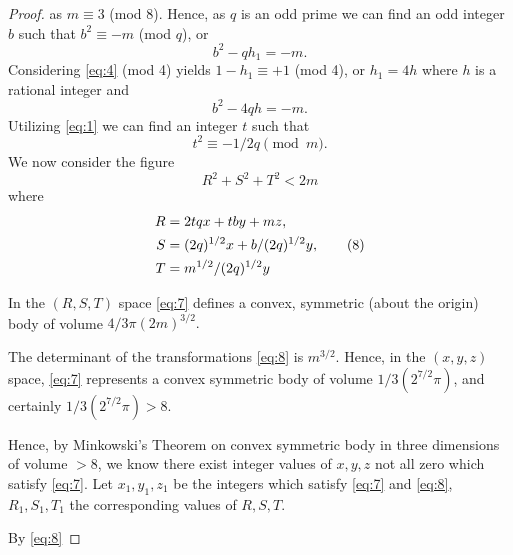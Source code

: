 \begin{proof}
as $m\equiv3$ (mod 8).
Hence, as $q$ is an odd prime we can find an odd integer $b$ such that $b^{2}\equiv-m$ (mod $q$), or
\begin{equation}
b^{2}-qh_{1}=-m. \label{eq:4} \tag{4}
\end{equation}
Considering \eqref{eq:4} (mod 4) yields $1-h_{1}\equiv+1$ (mod 4), or $h_{1}=4h$ where $h$ is a rational integer and
\begin{equation}
b^{2}-4qh=-m. \label{eq:5} \tag{5}
\end{equation}
Utilizing \eqref{eq:1} we can find an integer $t$ such that
\begin{equation}
t^{2}\equiv-1/2q \pmod{m}. \label{eq:6} \tag{6}
\end{equation}
We now consider the figure
\begin{equation}
R^{2}+S^{2}+T^{2}<2m \label{eq:7} \tag{7}
\end{equation}
where
\begin{align}
R&=2tqx+tby+mz, \notag \\
S&=(2q)^{1/2}x+b/(2q)^{1/2}y, \label{eq:8} \tag{8} \\
T&=m^{1/2}/(2q)^{1/2}y \notag
\end{align}

In the $(R, S, T)$ space \eqref{eq:7} defines a convex, symmetric (about the origin) body of volume $4/3\pi(2m)^{3/2}.$

The determinant of the transformations \eqref{eq:8} is $m^{3/2}$. Hence, in the $(x, y, z)$ space, \eqref{eq:7} represents a
convex symmetric body of volume $1/3(2^{7/2}\pi)$, and certainly $1/3(2^{7/2}\pi) > 8$.

Hence, by Minkowski's Theorem on convex symmetric body in three dimensions of volume $>8$, we know there exist
integer values of $x, y, z$ not all zero which satisfy \eqref{eq:7}. Let $x_{1}, y_{1}, z_{1}$ be the integers which satisfy
\eqref{eq:7} and \eqref{eq:8}, $R_{1}, S_{1}, T_{1}$ the corresponding values of $R, S, T$.

By \eqref{eq:8}


\end{proof}
